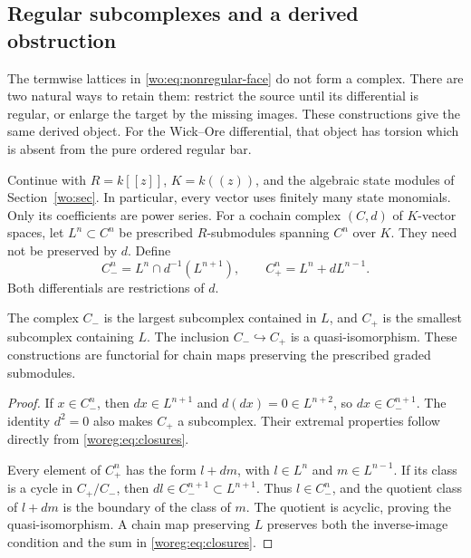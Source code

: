 \subsection{Regular subcomplexes and a derived obstruction}

The termwise lattices in \eqref{wo:eq:nonregular-face} do not form a
complex.  There are two natural ways to retain them: restrict the source
until its differential is regular, or enlarge the target by the missing
images.  These constructions give the same derived object.  For the
Wick--Ore differential, that object has torsion which is absent from the
pure ordered regular bar.

Continue with \(R=k[[z]]\), \(K=k((z))\), and the algebraic state
modules of Section~\ref{wo:sec}.  In particular, every vector uses
finitely many state monomials.  Only its coefficients are power series.
For a cochain complex \((C,d)\) of \(K\)-vector spaces, let
\(L^n\subset C^n\) be prescribed \(R\)-submodules spanning
\(C^n\) over \(K\).  They need not be preserved by \(d\).  Define
\begin{equation}\label{woreg:eq:closures}
 C_-^n=L^n\cap d^{-1}(L^{n+1}),\qquad
 C_+^n=L^n+dL^{n-1}.
\end{equation}
Both differentials are restrictions of \(d\).

\begin{lemma}\label{woreg:lem:closures}
The complex \(C_-\) is the largest subcomplex contained in \(L\),
and \(C_+\) is the smallest subcomplex containing \(L\).
The inclusion \(C_-\hookrightarrow C_+\) is a quasi-isomorphism.
These constructions are functorial for chain maps preserving the
prescribed graded submodules.
\end{lemma}
\begin{proof}
If \(x\in C_-^n\), then \(dx\in L^{n+1}\) and
\(d(dx)=0\in L^{n+2}\), so \(dx\in C_-^{n+1}\).
The identity \(d^2=0\) also makes \(C_+\) a subcomplex.
Their extremal properties follow directly from
\eqref{woreg:eq:closures}.

Every element of \(C_+^n\) has the form \(l+dm\), with
\(l\in L^n\) and \(m\in L^{n-1}\).  If its class is a cycle
in \(C_+/C_-\), then \(dl\in C_-^{n+1}\subset L^{n+1}\).
Thus \(l\in C_-^n\), and the quotient class of \(l+dm\) is the
boundary of the class of \(m\).  The quotient is acyclic, proving
the quasi-isomorphism.  A chain map preserving \(L\) preserves both
the inverse-image condition and the sum in
\eqref{woreg:eq:closures}.
\end{proof}


